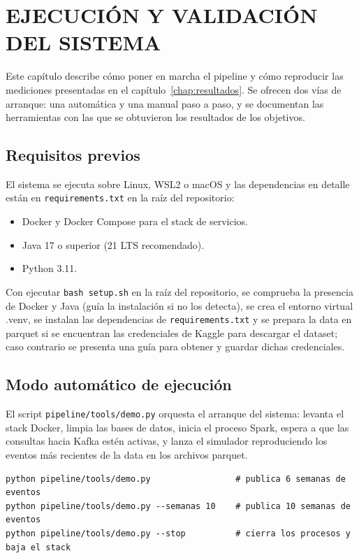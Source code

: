 \chapter{EJECUCIÓN Y VALIDACIÓN DEL SISTEMA}
\label{chap:ejecucion}

Este capítulo describe cómo poner en marcha el pipeline y cómo reproducir las mediciones presentadas en el capítulo~\ref{chap:resultados}. Se ofrecen dos vías de arranque: una automática y una manual paso a paso, y se documentan las herramientas con las que se obtuvieron los resultados de los objetivos.

\section{Requisitos previos}
\label{sec:ejec-requisitos}

El sistema se ejecuta sobre Linux, WSL2 o macOS y las dependencias en detalle están en \texttt{requirements.txt} en la raíz del repositorio:

\begin{itemize}
  \item Docker y Docker Compose para el stack de servicios.
  \item Java 17 o superior (21 LTS recomendado).
  \item Python 3.11.
\end{itemize}

Con ejecutar \texttt{bash setup.sh} en la raíz del repositorio, se comprueba la presencia de Docker y Java (guía la instalación si no los detecta), se crea el entorno virtual .venv, se instalan las dependencias de \texttt{requirements.txt} y se prepara la data en parquet si se encuentran las credenciales de Kaggle para descargar el dataset; caso contrario se presenta una guía para obtener y guardar dichas credenciales.

\section{Modo automático de ejecución}
\label{sec:ejec-demo}

El script \texttt{pipeline/tools/demo.py} orquesta el arranque del sistema: levanta el stack Docker, limpia las bases de datos, inicia el proceso Spark, espera a que las consultas hacia Kafka estén activas, y lanza el simulador reproduciendo los eventos más recientes de la data en los archivos parquet.

{\footnotesize
\begin{verbatim}
python pipeline/tools/demo.py                 # publica 6 semanas de eventos
python pipeline/tools/demo.py --semanas 10    # publica 10 semanas de eventos
python pipeline/tools/demo.py --stop          # cierra los procesos y baja el stack
\end{verbatim}
}

